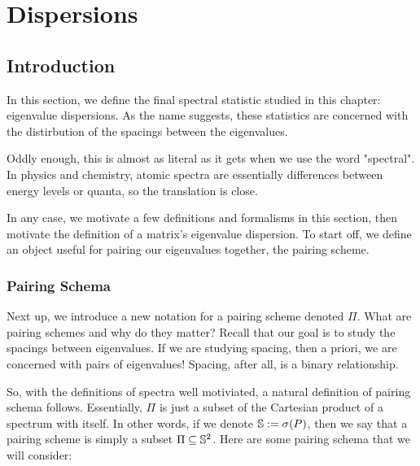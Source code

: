 
\chapter{Dispersions}

\section{Introduction}

In this section, we define the final spectral statistic studied in this chapter: eigenvalue dispersions. As the name suggests, these statistics are concerned with the distirbution of the spacings between the eigenvalues. 

Oddly enough, this is almost as literal as it gets when we use the word "spectral". In physics and chemistry, atomic spectra are essentially differences between energy levels or quanta, so the translation is close. 

In any case, we motivate a few definitions and formalisms in this section, then motivate the definition of a matrix's eigenvalue dispersion. To start off, we define an object useful for pairing our eigenvalues together, the pairing scheme.


\subsection{Pairing Schema}

Next up, we introduce a new notation for a pairing scheme denoted $\Pi$. What are pairing schemes and why do they matter? Recall that our goal is to study the spacings between eigenvalues. If we are studying spacing, then a priori, we are concerned with pairs of eigenvalues! Spacing, after all, is a binary relationship. 

So, with the definitions of spectra well motiviated, a natural definition of pairing schema follows. Essentially, $\Pi$ is just a subset of the Cartesian product of a spectrum with itself. In other words, if we denote $\S := \sigma(P)$, then we say that a pairing scheme is simply a subset $\Pi \subseteq \S^2$. Here are some pairing schema that we will consider:

